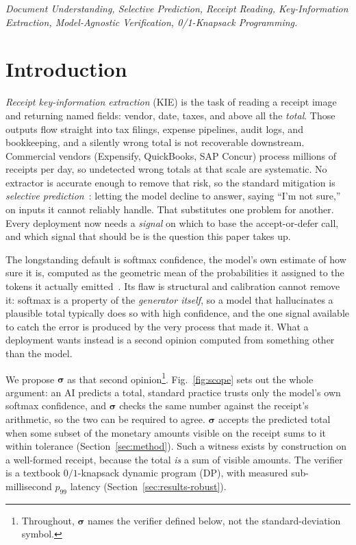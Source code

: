 \documentclass[conference]{IEEEtran}
\let\IEEEsigma\sigma
\DeclareRobustCommand{\sigma}{{\boldsymbol{\IEEEsigma}}}
\begin{document}
\vspace{\dimexpr 10pt-\parskip\relax}

\begin{IEEEkeywords}
\itshape
\linespread{1}\selectfont
Document Understanding, Selective Prediction, Receipt Reading, Key-Information Extraction, Model-Agnostic Verification, 0/1-Knapsack Programming.
\end{IEEEkeywords}

\setlength{\parskip}{6pt plus 1pt minus 0pt}

\section{Introduction}
\label{sec:intro}

\emph{Receipt key-information extraction} (KIE) is the task of reading a
receipt image and returning named fields: vendor, date, taxes, and above all
the \emph{total}. Those outputs flow straight into tax filings, expense
pipelines, audit logs, and bookkeeping, and a silently wrong total is not
recoverable downstream. Commercial vendors (Expensify, QuickBooks, SAP
Concur) process millions of receipts per day, so undetected wrong totals
at that scale are systematic. No extractor
is accurate enough to remove that risk, so the standard mitigation is
\emph{selective prediction}~\cite{geifman2017selectivenet,elyaniv2010foundations}: letting
the model decline to answer, saying ``I'm not sure,'' on inputs it cannot
reliably handle. That substitutes one problem for another. Every deployment
now needs a \emph{signal} on which to base the accept-or-defer call, and
which signal that should be is the question this paper takes up.

\noindent The longstanding default is softmax confidence, the model's own estimate of how sure it is, computed as the geometric mean of the
probabilities it assigned to the tokens it actually
emitted~\cite{malinin2021uncertainty,vashurin2025benchmark,fadeeva2023polygraph}.
Its flaw is structural and calibration cannot remove it: softmax is a
property of the \emph{generator itself}, so a model that hallucinates a
plausible total typically does so with high confidence, and the one signal
available to catch the error is produced by the very process that made it.
What a deployment wants instead is a second opinion computed from something
other than the model.

\noindent We propose $\sigma$ as that second
opinion\footnote{Throughout, $\sigma$ names the verifier
defined below, not the standard-deviation symbol.}.
Fig.~\ref{fig:scope} sets out the whole argument: an AI predicts a total,
standard practice trusts only the model's own softmax confidence, and
$\sigma$ checks the same number against the receipt's arithmetic, so the two
can be required to agree. $\sigma$ accepts the predicted total when some
subset of the monetary amounts visible on the receipt sums to it within
tolerance (Section~\ref{sec:method}). Such a witness exists by construction
on a well-formed receipt, because the total \emph{is} a sum of visible
amounts. The verifier is a textbook $0/1$-knapsack dynamic program (DP),
with measured sub-millisecond $p_{99}$ latency
(Section~\ref{sec:results-robust}).
\end{document}
